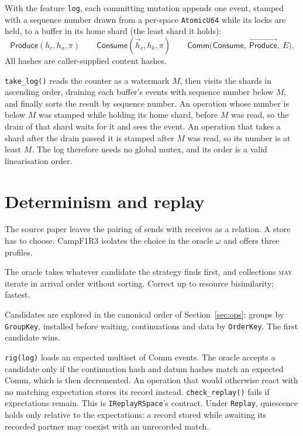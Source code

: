 \documentclass[11pt]{article}
\theoremstyle{plain}
\theoremstyle{definition}
\newcommand{\Camp}{CampF1R3}
\newcommand{\MAY}{\textsc{may}}
\newcommand{\code}[1]{\texttt{#1}}
\begin{document}
With the feature \code{log}, each committing mutation appends one event, stamped with
a sequence number drawn from a per-space \code{AtomicU64} while its locks are held, to
a buffer in its home shard (the least shard it holds):
\[
  \textsf{Produce}(h_c,h_a,\pi)\qquad
  \textsf{Consume}(\vec h_c,h_k,\pi)\qquad
  \textsf{Comm}\big(\textsf{Consume},\ \overrightarrow{\textsf{Produce}},\ E\big).
\]
All hashes are caller-supplied content hashes.

\code{take\_log()} reads the counter as a watermark $M$, then visits the shards in
ascending order, draining each buffer's events with sequence number below $M$, and
finally sorts the result by sequence number. An operation whose number is below $M$
was stamped while holding its home shard, before $M$ was read, so the drain of that
shard waits for it and sees the event. An operation that takes a shard after the
drain passed it is stamped after $M$ was read, so its number is at least $M$. The
log therefore needs no global mutex, and its order is a valid linearisation order.

\section{Determinism and replay}\label{sec:determinism}

The source paper leaves the pairing of sends with receives as a relation. A store
has to choose. \Camp{} isolates the choice in the oracle $\omega$ and offers three
profiles.

\begin{description}[nosep,leftmargin=1.5em,style=nextline]
\item[\code{Free}.] The oracle takes whatever candidate the strategy finds first,
  and collections \MAY{} iterate in arrival order without sorting. Correct up to
  resource bisimilarity; fastest.
\item[\code{Deterministic} (default).] Candidates are explored in the canonical
  order of Section~\ref{sec:ops}: groups by \code{GroupKey}, installed before waiting,
  continuations and data by \code{OrderKey}. The first candidate wins.
\item[\code{Replay}.] \code{rig(log)} loads an expected multiset of \textsf{Comm}
  events. The oracle accepts a candidate only if the continuation hash and datum hashes
  match an expected \textsf{Comm}, which is then decremented. An operation that would
  otherwise react with no matching expectation stores its record instead.
  \code{check\_replay()} fails if expectations remain. This is \code{IReplayRSpace}'s
  contract. Under \code{Replay}, quiescence holds only relative to the expectations:
  a record stored while awaiting its recorded partner may coexist with an unrecorded
  match.
\end{description}
\end{document}
